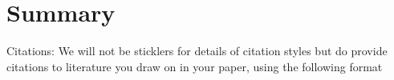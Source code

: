 \documentclass[12pt]{article}
\begin{document}



\section{Summary}

Citations:   We will not be sticklers for details of citation styles but do provide citations to literature you draw on in your paper, using the following format
\end{document}
